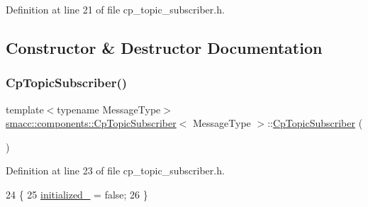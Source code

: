 Definition at line 21 of file cp\+\_\+topic\+\_\+subscriber.\+h.



\subsection{Constructor \& Destructor Documentation}
\mbox{\label{classsmacc_1_1components_1_1CpTopicSubscriber_aeb25b3a5d149c6256e35bc4049cc0b6f}} 
\subsubsection{\texorpdfstring{Cp\+Topic\+Subscriber()}{CpTopicSubscriber()}\hspace{0.1cm}{\footnotesize\ttfamily [1/2]}}
{\footnotesize\ttfamily template$<$typename Message\+Type$>$ \\
\hyperlink{classsmacc_1_1components_1_1CpTopicSubscriber}{smacc\+::components\+::\+Cp\+Topic\+Subscriber}$<$ Message\+Type $>$\+::\hyperlink{classsmacc_1_1components_1_1CpTopicSubscriber}{Cp\+Topic\+Subscriber} (\begin{DoxyParamCaption}{ }\end{DoxyParamCaption})\hspace{0.3cm}{\ttfamily [inline]}}



Definition at line 23 of file cp\+\_\+topic\+\_\+subscriber.\+h.


\begin{DoxyCode}
24     \{
25         \hyperlink{classsmacc_1_1components_1_1CpTopicSubscriber_a666e60629820ef146ade691a36c41e0a}{initialized\_} = \textcolor{keyword}{false};
26     \}
\end{DoxyCode}
\mbox{\label{classsmacc_1_1components_1_1CpTopicSubscriber_a331fb12e76c4c9e26f88a6cbb5c6f8cd}} 
